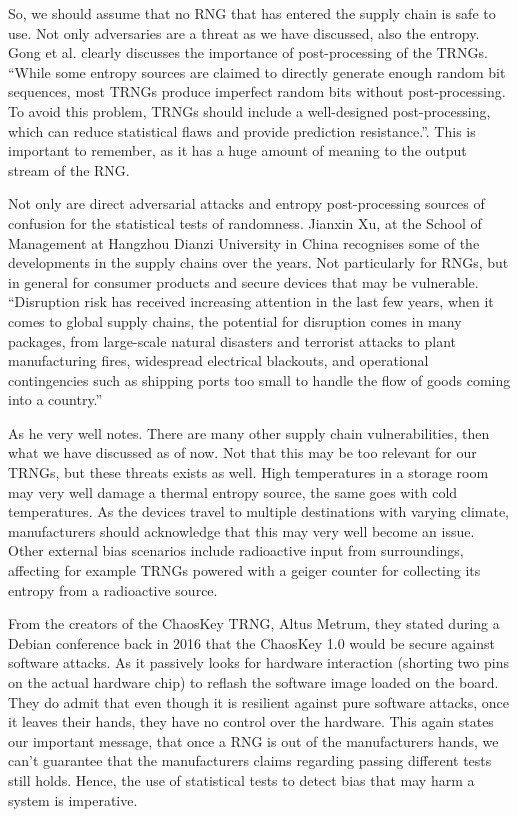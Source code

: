 \documentclass[]{final_report}
\begin{document}
\par{So, we should assume that no RNG that has entered the supply chain is safe to use. Not only adversaries are a threat as we have discussed, also the entropy. Gong et al. \cite{Gong:2019} clearly discusses the importance of post-processing of the TRNGs. ``While some entropy sources are claimed to directly generate enough random bit sequences, most TRNGs produce imperfect random bits without post-processing. To avoid this problem, TRNGs should include a well-designed post-processing, which can reduce statistical flaws and provide prediction resistance.''. This is important to remember, as it has a huge amount of meaning to the output stream of the RNG.}

\par{Not only are direct adversarial attacks and entropy post-processing sources of confusion for the statistical tests of randomness. Jianxin Xu, at the School of Management at Hangzhou Dianzi University in China recognises some of the developments in the supply chains over the years\cite{Xu:2008}. Not particularly for RNGs, but in general for consumer products and secure devices that may be vulnerable. ``Disruption risk has received increasing attention in the last few years, when it comes to global supply chains, the potential for disruption comes in many packages, from large-scale natural disasters and terrorist attacks to plant manufacturing fires, widespread electrical blackouts, and operational contingencies such as shipping ports too small to handle the flow of goods coming into a country.''}

\par{As he very well notes. There are many other supply chain vulnerabilities, then what we have discussed as of now. Not that this may be too relevant for our TRNGs, but these threats exists as well. High temperatures in a storage room may very well damage a thermal entropy source, the same goes with cold temperatures. As the devices travel to multiple destinations with varying climate, manufacturers should acknowledge that this may very well become an issue. Other external bias scenarios include radioactive input from surroundings, affecting for example TRNGs powered with a geiger counter for collecting its entropy from a radioactive source.}

\par{From the creators of the ChaosKey TRNG, Altus Metrum, they stated during a Debian conference back in 2016 \cite{Garbee:2016} that the ChaosKey 1.0 would be secure against software attacks. As it passively looks for hardware interaction (shorting two pins on the actual hardware chip) to reflash the software image loaded on the board. They do admit that even though it is resilient against pure software attacks, once it leaves their hands, they have no control over the hardware. This again states our important message, that once a RNG is out of the manufacturers hands, we can't guarantee that the manufacturers claims regarding passing different tests still holds. Hence, the use of statistical tests to detect bias that may harm a system is imperative.}
\end{document}
